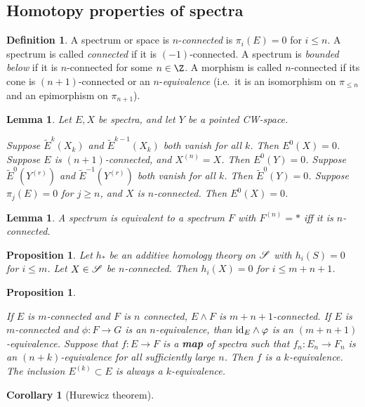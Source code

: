 \documentclass[11pt]{article}
\renewcommand{\comment}{}
\theoremstyle{plain}
\newtheorem{lem}[thm]{Lemma}
\newtheorem{prop}[thm]{Proposition}
\newtheorem{cor}[thm]{Corollary}
\theoremstyle{definition}
\newtheorem{defn}[thm]{Definition}
\begin{document}
\subsection{Homotopy properties of spectra}
\comment{
\setcounter{thm}{3}
\begin{defn}
A spectrum or space is $n$-\emph{connected} is $\pi_i(E)=0$ for $i\leq n$. A
spectrum is called \emph{connected} if it is $(-1)$-connected. A spectrum is
\emph{bounded below} if it is $n$-connected for some $n\in\Z$. A morphism is
called $n$-connected if its cone is $(n+1)$-connected or an
$n$-\emph{equivalence} (i.e.\ it is an isomorphism on $\pi_{\leq n}$ and an
epimorphism on $\pi_{n+1}$).
\end{defn}
\setcounter{thm}{0}
\begin{lem}Let $E,X$ be spectra, and let $Y$ be a pointed CW-space.
\begin{itemise}
\itm[(i)] Suppose $\widetilde E^k(X_k)$ and $\widetilde E^{k-1}(X_k)$ both
vanish for all $k$. Then $E^0(X)=0$.
\itm[(ii)] Suppose $E$ is $(n+1)$-connected, and $X^{(n)}=X$. Then $E^0(Y)=0$.
\itm[(iii)] Suppose $\widetilde E^0(Y^{(r)})$ and $\widetilde E^{-1}(Y^{(r)})$
both vanish for all $k$. Then $\widetilde E^0(Y)=0$.
\itm[(iv)] Suppose $\pi_j(E)=0$ for $j\geq n$, and $X$ is $n$-connected. Then
$E^0(X)=0$.
\end{itemise}
\end{lem}
\begin{lem}
A spectrum is equivalent to a spectrum $F$ with $F^{(n)}=*$ iff it is 
$n$-connected.
\end{lem}
\begin{prop}
Let $h_*$ be an additive homology theory on $\mathscr{S}$ with $h_i(S)=0$ for $i\leq
m$. Let $X\in\mathscr{S}$ be $n$-connected. Then $h_i(X)=0$ for $i\leq m+n+1$.
\end{prop}
\setcounter{thm}{4}
\begin{prop}\hfil
\begin{itemise}
\itm[(i)] If $E$ is $m$-connected and $F$ is $n$ connected, $E\wedge F$ is
$m+n+1$-connected.
\itm[(ii)] If $E$ is $m$-connected and $\phi:F\to G$ is an $n$-equivalence, than
$\textup{id}_E\wedge \varphi$ is an $(m+n+1)$-equivalence.
\itm[(iii)] Suppose that $f:E\to F$ is a \textbf{map} of spectra such that
$f_n:E_n\to F_n$ is an $(n+k)$-equivalence for all sufficiently large $n$. Then
$f$ is a $k$-equivalence.
\itm[(iv)] The inclusion $E^{(k)}\subset E$ is always a $k$-equivalence.
\end{itemise}
\end{prop}
\begin{cor}[Hurewicz theorem]

\end{cor}}
\end{document}
